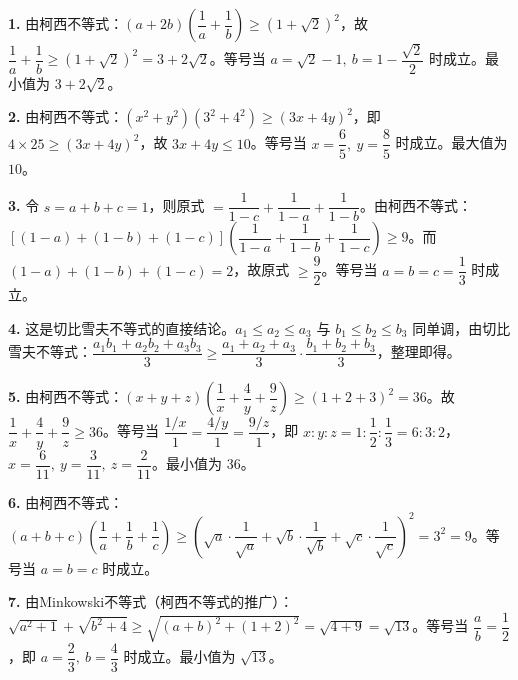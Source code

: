 \documentclass[12pt, a4paper]{ctexart}
\begin{document}
\begin{knowledgebox}[参考答案]
\textbf{1.} 由柯西不等式：$(a + 2b)\!\left(\dfrac{1}{a} + \dfrac{1}{b}\right) \geqslant \left(1 + \sqrt{2}\right)^2$，故 $\dfrac{1}{a} + \dfrac{1}{b} \geqslant (1+\sqrt{2})^2 = 3 + 2\sqrt{2}$。等号当 $a = \sqrt{2} - 1,\ b = 1 - \dfrac{\sqrt{2}}{2}$ 时成立。最小值为 $\boxed{3 + 2\sqrt{2}}$。

\medskip
\textbf{2.} 由柯西不等式：$(x^2 + y^2)(3^2 + 4^2) \geqslant (3x + 4y)^2$，即 $4 \times 25 \geqslant (3x+4y)^2$，故 $3x + 4y \leqslant 10$。等号当 $x = \dfrac{6}{5},\ y = \dfrac{8}{5}$ 时成立。最大值为 $\boxed{10}$。

\medskip
\textbf{3.} 令 $s = a + b + c = 1$，则原式 $= \dfrac{1}{1-c} + \dfrac{1}{1-a} + \dfrac{1}{1-b}$。由柯西不等式：$[(1-a) + (1-b) + (1-c)]\!\left(\dfrac{1}{1-a} + \dfrac{1}{1-b} + \dfrac{1}{1-c}\right) \geqslant 9$。而 $(1-a)+(1-b)+(1-c) = 2$，故原式 $\geqslant \dfrac{9}{2}$。等号当 $a = b = c = \dfrac{1}{3}$ 时成立。

\medskip
\textbf{4.} 这是切比雪夫不等式的直接结论。$a_1 \leqslant a_2 \leqslant a_3$ 与 $b_1 \leqslant b_2 \leqslant b_3$ 同单调，由切比雪夫不等式：$\dfrac{a_1 b_1 + a_2 b_2 + a_3 b_3}{3} \geqslant \dfrac{a_1 + a_2 + a_3}{3} \cdot \dfrac{b_1 + b_2 + b_3}{3}$，整理即得。

\medskip
\textbf{5.} 由柯西不等式：$(x + y + z)\!\left(\dfrac{1}{x} + \dfrac{4}{y} + \dfrac{9}{z}\right) \geqslant (1 + 2 + 3)^2 = 36$。故 $\dfrac{1}{x} + \dfrac{4}{y} + \dfrac{9}{z} \geqslant 36$。等号当 $\dfrac{1/x}{1} = \dfrac{4/y}{1} = \dfrac{9/z}{1}$，即 $x:y:z = 1:\dfrac{1}{2}:\dfrac{1}{3} = 6:3:2$，$x = \dfrac{6}{11},\ y = \dfrac{3}{11},\ z = \dfrac{2}{11}$。最小值为 $\boxed{36}$。

\medskip
\textbf{6.} 由柯西不等式：$(a+b+c)\!\left(\dfrac{1}{a}+\dfrac{1}{b}+\dfrac{1}{c}\right) \geqslant \left(\sqrt{a}\cdot\dfrac{1}{\sqrt{a}} + \sqrt{b}\cdot\dfrac{1}{\sqrt{b}} + \sqrt{c}\cdot\dfrac{1}{\sqrt{c}}\right)^2 = 3^2 = 9$。等号当 $a = b = c$ 时成立。

\medskip
\textbf{7.} 由Minkowski不等式（柯西不等式的推广）：$\sqrt{a^2+1} + \sqrt{b^2+4} \geqslant \sqrt{(a+b)^2 + (1+2)^2} = \sqrt{4+9} = \sqrt{13}$。等号当 $\dfrac{a}{b} = \dfrac{1}{2}$，即 $a = \dfrac{2}{3},\ b = \dfrac{4}{3}$ 时成立。最小值为 $\boxed{\sqrt{13}}$。


\end{knowledgebox}
\end{document}
